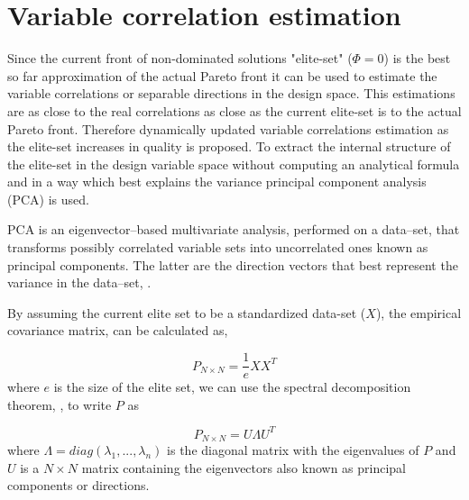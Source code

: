 
\section{Variable correlation estimation}
Since the current front of non-dominated solutions "elite-set" ($\Phi=0$) is the best so far approximation of the actual Pareto front it can be used to estimate the variable correlations or separable directions in the design space. This estimations are as close to the real correlations as close as the current elite-set is to the actual Pareto front. Therefore dynamically updated variable correlations estimation as the elite-set increases in quality is proposed. To extract the internal structure of the elite-set in the design variable space without computing an analytical formula and in a way which best explains the variance principal component analysis (PCA) is used. 
 
PCA is an eigenvector--based multivariate analysis, performed on a data--set, that transforms possibly correlated variable sets into uncorrelated ones known as principal components. The latter are the direction vectors that best represent the variance in the data--set, \cite{Haykin,Jolliffe_2002}.
 
By assuming the current elite set to be a standardized data-set ($X$), the empirical covariance matrix, \cite{Fodor_2002, Jolliffe_2002} can be calculated as,

\begin{equation} 
   P_{N\times N}= \frac{1}{e}XX^T
   \label{Cov_Mat} 
\end{equation}
where $e$ is the size of the elite set, we can use the spectral decomposition theorem, \cite{Axler_1997, Fodor_2002}, to write $P$ as

\begin{equation} 
   P_{N\times N}= U\Lambda U^T
   \label{spectral}
\end{equation}
where $\Lambda\!=\!diag(\lambda_1 , . . . , \lambda_n )$ is the diagonal matrix with the eigenvalues of $P$ and $U$ is a $N\!\times\!N$ matrix containing the eigenvectors also known as principal components or directions. 

